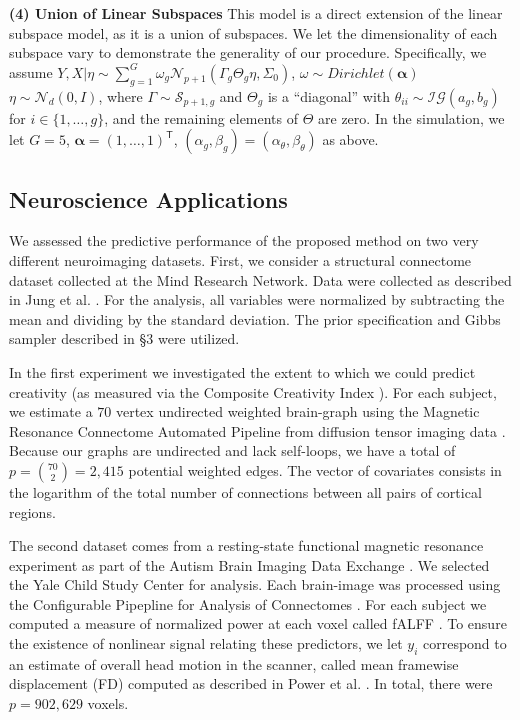 \documentclass{article} %
\providecommand{\mb}[1]{\boldsymbol{#1}}
\providecommand{\mc}[1]{\mathcal{#1}}
\newcommand{\T}{^{\ensuremath{\mathsf{T}}}}           %
\begin{document}
\textbf{(4) Union of Linear Subspaces}
This model is a direct extension of the linear subspace model, as it is a union of subspaces. We let the dimensionality of each subspace vary to demonstrate the generality of our procedure.  Specifically, we assume 	$Y,X |\eta \sim \sum_{g=1}^G \omega_g \mc{N}_{p+1}(\Gamma_g \Theta_g \eta ,\Sigma_0)$, $\omega \sim Dirichlet(\mb{\alpha})$ 
	$\eta \sim \mc{N}_d(0, I)$, 
where $\Gamma \sim \mc{S}_{p+1,g}$ and $\Theta_g$ is a ``diagonal'' with $\theta_{ii} \sim \mc{IG}(a_g,b_g)$ for  $i \in \{1, \ldots, g\}$, and the remaining elements of $\Theta$ are zero.
In the simulation, we let $G=5$,  $\mb{\alpha}=(1, \ldots, 1)\T$,  $(\alpha_g,\beta_g)=(\alpha_\theta,\beta_\theta)$ as above. %
  



\subsection{Neuroscience Applications}

We assessed the predictive performance of the proposed method on two very different neuroimaging datasets. First, we consider a structural connectome dataset collected at the Mind Research Network.  Data were collected as described in Jung et al. \cite{Jung2010}. For the analysis, all variables were normalized by subtracting the mean and dividing by the standard deviation. The  prior specification and Gibbs sampler described in \S 3 were utilized. 

In the first experiment we investigated the extent to which we could predict creativity (as measured via the Composite Creativity Index \cite{Arden2010}).   For each subject, we estimate a $70$ vertex undirected weighted brain-graph using the Magnetic Resonance Connectome Automated Pipeline \cite{MRCAP11} from diffusion tensor imaging data \cite{Mori2006}. Because our graphs are undirected and lack self-loops, we have a total of $p=\binom{70}{2}=2,415$ potential weighted edges. The vector of covariates consists in the logarithm of the total number of connections between all pairs of cortical regions. 

The second dataset comes from a resting-state functional magnetic resonance experiment as part of the Autism Brain Imaging Data Exchange \cite{Autism}.  We selected the Yale Child Study Center for analysis.  Each brain-image was processed using the Configurable Pipepline for Analysis of Connectomes \cite{cpac}. For each subject we computed a measure of normalized power at each voxel called fALFF \cite{Zou2008}.  To ensure the existence of nonlinear signal relating these predictors, we let $y_i$ correspond to an estimate of overall head motion in the scanner, called mean framewise displacement (FD) computed as described in Power et al. \cite{power}. In total, there were $p=902,629$ voxels. 
\end{document}
